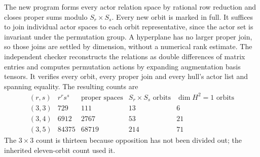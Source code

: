 The new program 
forms every actor relation space by rational row reduction and
closes proper sums modulo $S_r\times S_s$. Every new orbit is
marked in full. It suffices to join individual actor spaces to
each orbit representative, since the actor set is invariant
under the permutation group. A hyperplane has no larger proper
join, so those joins are settled by dimension, without a
numerical rank estimate. The independent checker
 reconstructs the
relations as double differences of matrix entries and computes
permutation actions by expanding augmentation basis tensors.
It verifies every orbit, every proper join and every hull's
actor list and spanning equality. The resulting counts are
\[
\begin{array}{c|r|r|r|r}
 (r,s)&r^rs^s&\text{proper spaces}&S_r\times S_s\text{ orbits}
       &\dim H^2=1\text{ orbits}\\\hline
 (3,3)&729&111&13&6\\
 (3,4)&6912&2767&53&21\\
 (3,5)&84375&68719&214&71
\end{array}
\]
The $3\times3$ count is thirteen because opposition has not
been divided out; the inherited eleven-orbit count used it.

